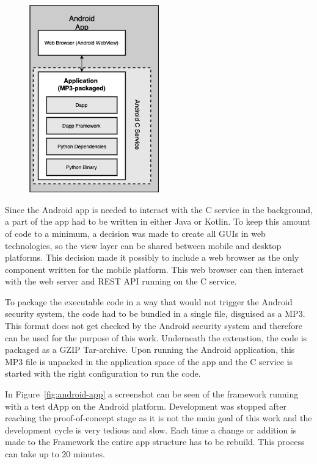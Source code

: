 \begin{figure}[h!]
	\centering
	\includegraphics[width=0.5\textwidth]{images/android-app.png}
	\caption{\label{fig:android-architecture}}
\end{figure}

Since the Android app is needed to interact with the C service in the background, a part of the app had to be written in either Java or Kotlin. To keep this amount of code to a minimum, a decision was made to create all GUIs in web technologies, so the view layer can be shared between mobile and desktop platforms. This decision made it possibly to include a web browser as the only component written for the mobile platform. This web browser can then interact with the web server and REST API running on the C service.

To package the executable code in a way that would not trigger the Android security system, the code had to be bundled in a single file, disguised as a MP3. This format does not get checked by the Android security system  and therefore can be used for the purpose of this work. Underneath the extenstion, the code is packaged as a GZIP Tar-archive. Upon running the Android application, this MP3 file is unpacked in the application space of the app and the C service is started with the right configuration to run the code.

In Figure~\ref{fig:android-app} a screenshot can be seen of the framework running with a test dApp on the Android platform. Development was stopped after reaching the proof-of-concept stage as it is not the main goal of this work and the development cycle is very tedious and slow. Each time a change or addition is made to the Framework the entire app structure has to be rebuild. This process can take up to 20 minutes. 

